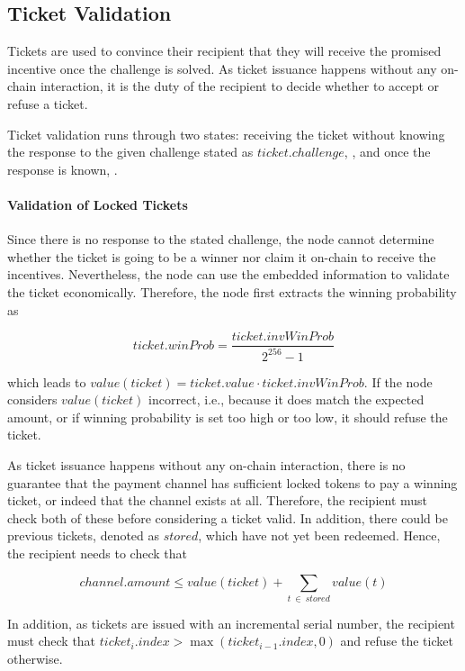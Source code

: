 \subsection{Ticket Validation}
\label{sec:tickets:validation}

Tickets are used to convince their recipient that they will receive the promised incentive once the challenge is solved. As ticket issuance happens without any on-chain interaction, it is the duty of the recipient to decide whether to accept or refuse a ticket.

Ticket validation runs through two states: receiving the ticket without knowing the response to the given challenge stated as $ticket.challenge$, , and once the response is known, .

\paragraph{Validation of Locked Tickets}
\label{sec:tickets:validation:locked}

Since there is no response to the stated challenge, the node cannot determine whether the ticket is going to be a winner nor claim it on-chain to receive the incentives. Nevertheless, the node can use the embedded information to validate the ticket economically. Therefore, the node first extracts the winning probability as

$$ticket.winProb = \frac{ticket.invWinProb}{2^{256} - 1} $$

which leads to $ value(ticket) = ticket.value \cdot ticket.invWinProb $. If the node considers $value(ticket)$ incorrect, i.e., because it does match the expected amount, or if winning probability is set too high or too low, it should refuse the ticket.

As ticket issuance happens without any on-chain interaction, there is no guarantee that the payment channel has sufficient locked tokens to pay a winning ticket, or indeed that the channel exists at all. Therefore, the recipient must check both of these before considering a ticket valid. In addition, there could be previous tickets, denoted as $stored$, which have not yet been redeemed. Hence, the recipient needs to check that

$$ channel.amount \le value(ticket) + \sum_{t \ \in \ stored} value(t)$$

In addition, as tickets are issued with an incremental serial number, the recipient must check that $ticket_i.index > \max(ticket_{i-1}.index,0)$ and refuse the ticket otherwise.

